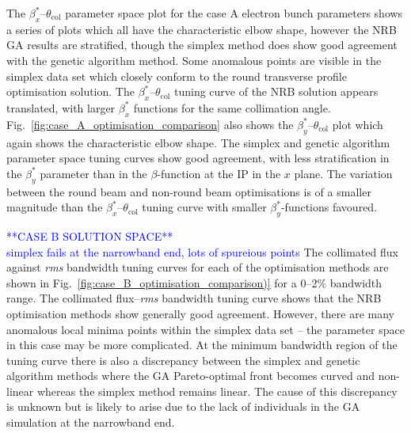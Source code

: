 \documentclass[../main.tex]{subfiles}
\begin{document}
The $\beta_{x}^{*}$--$\theta_{\mathrm{col}}$ parameter space plot for the case A electron bunch parameters shows a series of plots which all have the characteristic elbow shape, however the NRB GA results are stratified, though the simplex method does show good agreement with the genetic algorithm method. Some anomalous points are visible in the simplex data set which closely conform to the round transverse profile optimisation solution. The $\beta_{x}^{*}$--$\theta_{\mathrm{col}}$ tuning curve of the NRB solution appears translated, with larger $\beta_{x}^{*}$ functions for the same collimation angle. Fig.~\ref{fig:case_A_optimisation_comparison} also shows the $\beta_{y}^{*}$--$\theta_{\mathrm{col}}$ plot which again shows the characteristic elbow shape. The simplex and genetic algorithm parameter space tuning curves show good agreement, with less stratification in the $\beta_{y}^{*}$ parameter than in the $\beta$-function at the IP in the $x$ plane. The variation between the round beam and non-round beam optimisations is of a smaller magnitude than the $\beta_{x}^{*}$--$\theta_{\mathrm{col}}$ tuning curve with smaller $\beta_{y}^{*}$-functions favoured.   

\textcolor{blue}{**CASE B SOLUTION SPACE** \\ simplex fails at the narrowband end, lots of spureious points}
The collimated flux against \textit{rms} bandwidth tuning curves for each of the optimisation methods are shown in Fig.~\ref{fig:case_B_optimisation_comparison)} for a 0--2\% bandwidth range. The collimated flux--\textit{rms} bandwidth tuning curve shows that the NRB optimisation methods show generally good agreement. However, there are many anomalous local minima points within the simplex data set -- the parameter space in this case may be more complicated. At the minimum bandwidth region of the tuning curve there is also a discrepancy between the simplex and genetic algorithm methods where the GA Pareto-optimal front becomes curved and non-linear whereas the simplex method remains linear. The cause of this discrepancy is unknown but is likely to arise due to the lack of individuals in the GA simulation at the narrowband end.
\end{document}
